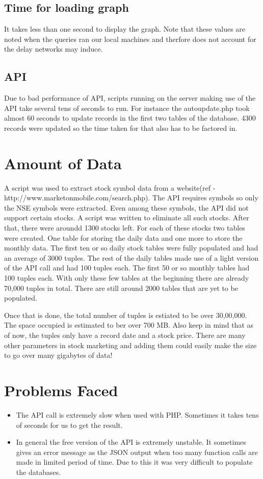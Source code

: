 \documentclass{report}
\begin{document}
\subsection{Time for loading graph}
It takes less than one second to display the graph.
Note that these values are noted when the queries ran our local machines and therfore does not
account for the delay networks may induce.

\subsection{API}
Due to bad performance of API, scripts running on the server making use of the API take several tens of seconds to run. For instance the autoupdate.php took almost 60 seconds to update records in the first two tables of the database. 4300 records were updated so the time taken for that also has to be factored in.

\section{Amount of Data}
A script was used to extract stock symbol data from a website(ref - http://www.marketonmobile.com/search.php). The API requires symbols so only the NSE symbols were extracted. Even among these symbols, the API did not support certain stocks. A script was written to eliminate all such stocks. After that, there were aroundd 1300 stocks left. For each of these stocks two tables were created. One table for storing the daily data and one more to store the monthly data. The first ten or so daily stock tables were fully populated and had an average of 3000 tuples. The rest of the daily tables made use of a light version of the API call and had 100 tuples each. The first 50 or so monthly tables had 100 tuples each.
With only these few tables at the beginning there are already 70,000 tuples in total. There are still around 2000 tables that are yet to be populated.

Once that is done, the total number of tuples is estiated to be over 30,00,000. The space occupied is estimated to ber over 700 MB. Also keep in mind that as of now, the tuples only have a record date and a stock price. There are many other parameters in stock marketing and adding them could easily make the size to go over many gigabytes of data!

\section{Problems Faced}
\begin{itemize}
	\item The API call is extremely slow when used with PHP. Sometimes it takes tens of seconds for us to get the result. 
	\item In general the free version of the API is extremely unstable. It sometimes gives an error message as the JSON output when too many function calls are made in limited period of time. Due to this it was very difficult to populate the databases.
\end{itemize}
\end{document}
